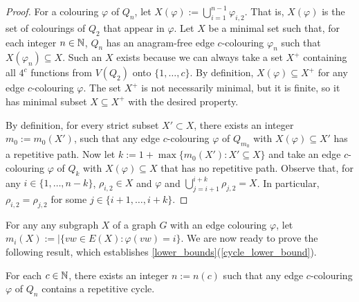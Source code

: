 \documentclass[kpfonts]{patmorin}
\begin{document}
\begin{proof}
    For a colouring $\varphi$ of $Q_n$, let $X(\varphi):=\bigcup_{i=1}^{n-1} \varphi_{i,2}$.  That is, $X(\varphi)$ is the set of colourings of $Q_2$ that appear in $\varphi$.  Let $X$ be a minimal set such that, for each integer $n\in\mathbb{N}$, $Q_n$ has an anagram-free edge $c$-colouring $\varphi_n$ such that $X(\varphi_n)\subseteq X$. Such an $X$ exists because we can always take a set $X^+$ containing all $4^c$ functions from $V(Q_2)$ onto $\{1,\ldots,c\}$.  By definition, $X(\varphi)\subseteq X^+$ for any edge $c$-colouring $\varphi$.  The set $X^+$ is not necessarily minimal, but it is finite, so it has minimal subset $X\subseteq X^+$ with the desired property.

    By definition, for every strict subset $X'\subset X$, there exists an integer $m_0:=m_0(X')$, such that any edge $c$-colouring $\varphi$ of $Q_{m_0}$ with $X(\varphi)\subseteq X'$ has a repetitive path. Now let $k:=1+\max\{m_0(X'):X'\subseteq X\}$ and take an edge $c$-colouring $\varphi$ of $Q_k$ with $X(\varphi)\subseteq X$ that has no repetitive path.  Observe that, for any $i\in\{1,\ldots,n-k\}$, $\rho_{i,2}\in X$ and $\varphi$ and $\bigcup_{j=i+1}^{i+k}\rho_{j,2}=X$.  In particular, $\rho_{i,2}=\rho_{j,2}$ for some $j\in\{i+1,\ldots,i+k\}$.
\end{proof}

For any any subgraph $X$ of a graph $G$ with an edge colouring $\varphi$, let $m_i(X):=|\{vw\in E(X): \varphi(vw)=i\}$.
We are now ready to prove the following result, which establishes \cref{lower_bounds}(\ref{cycle_lower_bound}).

\begin{lem}\label{cycle_lower_bound_lemma}
    For each $c\in\mathbb{N}$, there exists an integer $n:=n(c)$ such that any edge $c$-colouring $\varphi$ of $Q_n$ contains a repetitive cycle.
\end{lem}
\end{document}
